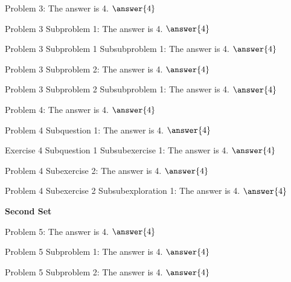\documentclass{ximera}
\begin{document}
\begin{problem}\label{problem:3}
    Problem 3: The answer is 4. $\answer{4}$
    \begin{problem}\label{problem:3.1}
        Problem 3 Subproblem 1: The answer is 4. $\answer{4}$
        \begin{problem}\label{problem:3.1.1}
            Problem 3 Subproblem 1 Subsubproblem 1: The answer is 4. $\answer{4}$
        \end{problem} 
    \end{problem}
    \begin{problem}\label{problem:3.2}
        Problem 3 Subproblem 2: The answer is 4. $\answer{4}$
        \begin{problem}\label{problem:3.2.1}
            Problem 3 Subproblem 2 Subsubproblem 1: The answer is 4. $\answer{4}$
        \end{problem} 
    \end{problem} 
\end{problem} 

\begin{problem}\label{problem:4}
    Problem 4: The answer is 4. $\answer{4}$
    \begin{question}
        Problem 4 Subquestion 1: The answer is 4. $\answer{4}$
        \begin{exercise}
            Exercise 4 Subquestion 1 Subsubexercise 1: The answer is 4. $\answer{4}$
        \end{exercise}
    \end{question}
    \begin{exercise}
        Problem 4 Subexercise 2: The answer is 4. $\answer{4}$
        \begin{exploration}
            Problem 4 Subexercise 2 Subsubexploration 1: The answer is 4. $\answer{4}$
        \end{exploration}
    \end{exercise}
\end{problem}
%
\numberedProblemstrue

{{\bfseries \large Second Set}}

\begin{problem}\label{problem:5}
    Problem 5: The answer is 4. $\answer{4}$
    \begin{problem}\label{problem:5.1}
        Problem 5 Subproblem 1: The answer is 4. $\answer{4}$
    \end{problem} 
    \begin{problem}\label{problem:5.2}
        Problem 5 Subproblem 2: The answer is 4. $\answer{4}$
    \end{problem} 
\end{problem} 
\end{document}

